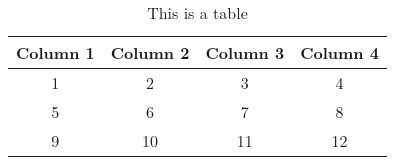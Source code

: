 \begin{table}[htbp]
\centering
\begin{tabular}{||c c c c||}
\hline
Column 1 & Column 2 & Column 3 & Column 4 \\ 
[0.5ex]
\hline\hline
1 & 2 & 3 & 4 \\
\hline
5 & 6 & 7 & 8 \\
\hline
9 & 10 & 11 & 12 \\
\hline
\end{tabular}
\label{tab:tab3}
\caption{This is a table}
\end{table}